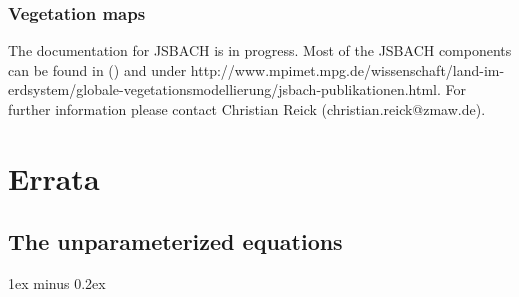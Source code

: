 \documentclass[DIV14,BCOR1cm,11pt,a4paper,twoside]{scrreprt}
\begin{document}
\subsection{Vegetation maps}
The documentation for JSBACH is in progress. Most of the JSBACH components can be found in (\cite{raddatz2007}) and under http://www.mpimet.mpg.de/wissenschaft/land-im-erdsystem/globale-vegetationsmodellierung/jsbach-publikationen.html. For further information please contact Christian Reick (christian.reick@zmaw.de).

\chapter{Errata}


\begin{appendix}
\chapter{The unparameterized equations}\label{sec:diabat}
 

\parskip 1ex minus 0.2ex


\end{appendix}




\end{document}
